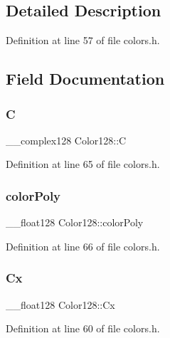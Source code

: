 \subsection{Detailed Description}


Definition at line 57 of file colors.\+h.



\subsection{Field Documentation}
\mbox{\label{struct_color128_a7d8d0e07afcc033267f5c6b8ee5460af}} 
\subsubsection{\texorpdfstring{C}{C}}
{\footnotesize\ttfamily \+\_\+\+\_\+complex128 Color128\+::C}



Definition at line 65 of file colors.\+h.

\mbox{\label{struct_color128_aad976108c20d5dac944813afb39e1b39}} 
\subsubsection{\texorpdfstring{color\+Poly}{colorPoly}}
{\footnotesize\ttfamily \+\_\+\+\_\+float128 Color128\+::color\+Poly}



Definition at line 66 of file colors.\+h.

\mbox{\label{struct_color128_a9c7a57c32aa6d05bac44b977d83261b2}} 
\subsubsection{\texorpdfstring{Cx}{Cx}}
{\footnotesize\ttfamily \+\_\+\+\_\+float128 Color128\+::\+Cx}



Definition at line 60 of file colors.\+h.

\mbox{\label{struct_color128_ac7bd2873d9dcc9496c30762846e9357a}} 
